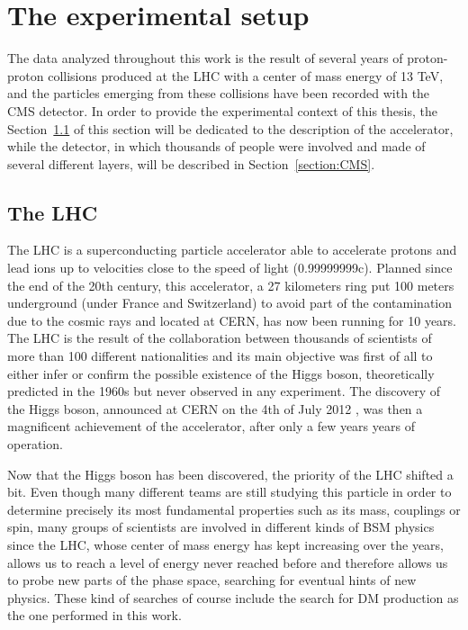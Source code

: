 \documentclass[a4paper, 10pt, openright]{report}
\begin{document}
\chapter{The experimental setup} \label{chapter:Device}

The data analyzed throughout this work is the result of several years of proton-proton collisions produced at the \ac{LHC} with a center of mass energy of 13 TeV, and the particles emerging from these collisions have been recorded with the \ac{CMS} detector. In order to provide the experimental context of this thesis, the Section~\ref{section:LHC} of this section will be dedicated to the description of the accelerator, while the detector, in which thousands of people were involved and made of several different layers, will be described in Section~\ref{section:CMS}.

\section{The \acf{LHC}} \label{section:LHC}

The \acf{LHC} is a superconducting particle accelerator able to accelerate protons and lead ions up to velocities close to the speed of light (0.99999999c). Planned since the end of the 20th century, this accelerator, a 27 kilometers ring put 100 meters underground (under France and Switzerland) to avoid part of the contamination due to the cosmic rays and located at \ac{CERN}, has now been running for 10 years. The \ac{LHC} is the result of the collaboration between thousands of scientists of more than 100 different nationalities and its main objective was first of all to either infer or confirm the possible existence of the Higgs boson, theoretically predicted in the 1960s \cite{HiggsPostulate1, HiggsPostulate2} but never observed in any experiment. The discovery of the Higgs boson, announced at \ac{CERN} on the 4th of July 2012 \cite{HiggsDiscovery1, HiggsDiscovery2}, was then a magnificent achievement of the accelerator, after only a few years years of operation.

Now that the Higgs boson has been discovered, the priority of the \ac{LHC} shifted a bit. Even though many different teams are still studying this particle in order to determine precisely its most fundamental properties such as its mass, couplings or spin, many groups of scientists are involved in different kinds of \ac{BSM} physics since the \ac{LHC}, whose center of mass energy has kept increasing over the years, allows us to reach a level of energy never reached before and therefore allows us to probe new parts of the phase space, searching for eventual hints of new physics. These kind of searches of course include the search for \ac{DM} production as the one performed in this work. 
\end{document}
